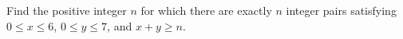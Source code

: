 Find the positive integer $n$ for which there are exactly $n$ integer pairs satisfying $0\le x\le6$, $0\le y\le7$, and $x+y\ge n$.
